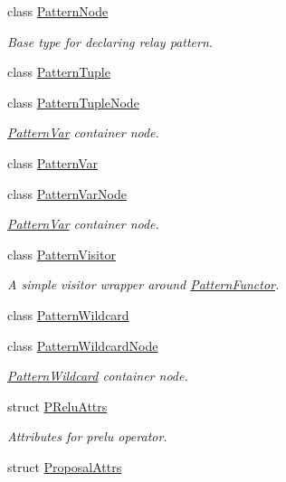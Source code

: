\begin{DoxyCompactItemize}
class \hyperlink{classtvm_1_1relay_1_1PatternNode}{Pattern\+Node}
\begin{DoxyCompactList}\small\item\em Base type for declaring relay pattern. \end{DoxyCompactList}\item 
class \hyperlink{classtvm_1_1relay_1_1PatternTuple}{Pattern\+Tuple}
\item 
class \hyperlink{classtvm_1_1relay_1_1PatternTupleNode}{Pattern\+Tuple\+Node}
\begin{DoxyCompactList}\small\item\em \hyperlink{classtvm_1_1relay_1_1PatternVar}{Pattern\+Var} container node. \end{DoxyCompactList}\item 
class \hyperlink{classtvm_1_1relay_1_1PatternVar}{Pattern\+Var}
\item 
class \hyperlink{classtvm_1_1relay_1_1PatternVarNode}{Pattern\+Var\+Node}
\begin{DoxyCompactList}\small\item\em \hyperlink{classtvm_1_1relay_1_1PatternVar}{Pattern\+Var} container node. \end{DoxyCompactList}\item 
class \hyperlink{classtvm_1_1relay_1_1PatternVisitor}{Pattern\+Visitor}
\begin{DoxyCompactList}\small\item\em A simple visitor wrapper around \hyperlink{classtvm_1_1relay_1_1PatternFunctor}{Pattern\+Functor}. \end{DoxyCompactList}\item 
class \hyperlink{classtvm_1_1relay_1_1PatternWildcard}{Pattern\+Wildcard}
\item 
class \hyperlink{classtvm_1_1relay_1_1PatternWildcardNode}{Pattern\+Wildcard\+Node}
\begin{DoxyCompactList}\small\item\em \hyperlink{classtvm_1_1relay_1_1PatternWildcard}{Pattern\+Wildcard} container node. \end{DoxyCompactList}\item 
struct \hyperlink{structtvm_1_1relay_1_1PReluAttrs}{P\+Relu\+Attrs}
\begin{DoxyCompactList}\small\item\em Attributes for prelu operator. \end{DoxyCompactList}\item 
struct \hyperlink{structtvm_1_1relay_1_1ProposalAttrs}{Proposal\+Attrs}

\end{DoxyCompactItemize}

